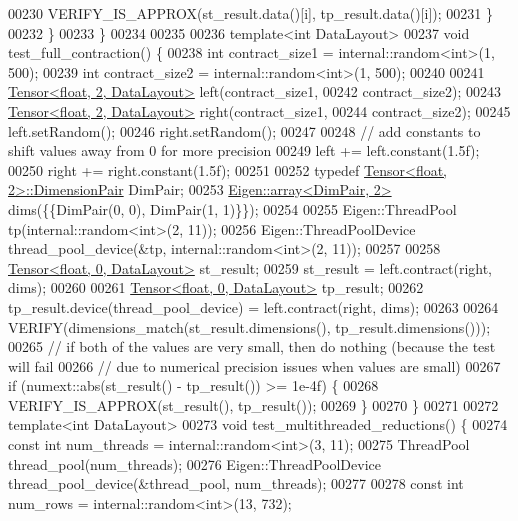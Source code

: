 \begin{DoxyCode}
00230       VERIFY\_IS\_APPROX(st\_result.data()[i], tp\_result.data()[i]);
00231     \}
00232   \}
00233 \}
00234 
00235 
00236 \textcolor{keyword}{template}<\textcolor{keywordtype}{int} DataLayout>
00237 \textcolor{keywordtype}{void} test\_full\_contraction() \{
00238   \textcolor{keywordtype}{int} contract\_size1 = internal::random<int>(1, 500);
00239   \textcolor{keywordtype}{int} contract\_size2 = internal::random<int>(1, 500);
00240 
00241   \hyperlink{class_eigen_1_1_tensor}{Tensor<float, 2, DataLayout>} left(contract\_size1,
00242                                     contract\_size2);
00243   \hyperlink{class_eigen_1_1_tensor}{Tensor<float, 2, DataLayout>} right(contract\_size1,
00244                                     contract\_size2);
00245   left.setRandom();
00246   right.setRandom();
00247 
00248   \textcolor{comment}{// add constants to shift values away from 0 for more precision}
00249   left += left.constant(1.5f);
00250   right += right.constant(1.5f);
00251 
00252   \textcolor{keyword}{typedef} \hyperlink{class_eigen_1_1_tensor}{Tensor<float, 2>::DimensionPair} DimPair;
00253   \hyperlink{class_eigen_1_1array}{Eigen::array<DimPair, 2>} dims(\{\{DimPair(0, 0), DimPair(1, 1)\}\});
00254 
00255   Eigen::ThreadPool tp(internal::random<int>(2, 11));
00256   Eigen::ThreadPoolDevice thread\_pool\_device(&tp, internal::random<int>(2, 11));
00257 
00258   \hyperlink{class_eigen_1_1_tensor}{Tensor<float, 0, DataLayout>} st\_result;
00259   st\_result = left.contract(right, dims);
00260 
00261   \hyperlink{class_eigen_1_1_tensor}{Tensor<float, 0, DataLayout>} tp\_result;
00262   tp\_result.device(thread\_pool\_device) = left.contract(right, dims);
00263 
00264   VERIFY(dimensions\_match(st\_result.dimensions(), tp\_result.dimensions()));
00265   \textcolor{comment}{// if both of the values are very small, then do nothing (because the test will fail}
00266   \textcolor{comment}{// due to numerical precision issues when values are small)}
00267   \textcolor{keywordflow}{if} (numext::abs(st\_result() - tp\_result()) >= 1e-4f) \{
00268     VERIFY\_IS\_APPROX(st\_result(), tp\_result());
00269   \}
00270 \}
00271 
00272 \textcolor{keyword}{template}<\textcolor{keywordtype}{int} DataLayout>
00273 \textcolor{keywordtype}{void} test\_multithreaded\_reductions() \{
00274   \textcolor{keyword}{const} \textcolor{keywordtype}{int} num\_threads = internal::random<int>(3, 11);
00275   ThreadPool thread\_pool(num\_threads);
00276   Eigen::ThreadPoolDevice thread\_pool\_device(&thread\_pool, num\_threads);
00277 
00278   \textcolor{keyword}{const} \textcolor{keywordtype}{int} num\_rows = internal::random<int>(13, 732);

\end{DoxyCode}
